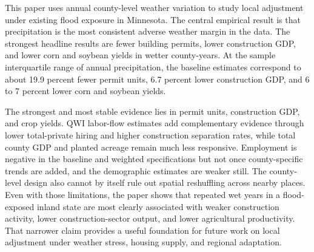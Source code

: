 \documentclass[12pt]{article}
\begin{document}
This paper uses annual county-level weather variation to study local adjustment under existing flood exposure in Minnesota. The central empirical result is that precipitation is the most consistent adverse weather margin in the data. The strongest headline results are fewer building permits, lower construction GDP, and lower corn and soybean yields in wetter county-years. At the sample interquartile range of annual precipitation, the baseline estimates correspond to about 19.9 percent fewer permit units, 6.7 percent lower construction GDP, and 6 to 7 percent lower corn and soybean yields.

The strongest and most stable evidence lies in permit units, construction GDP, and crop yields. QWI labor-flow estimates add complementary evidence through lower total-private hiring and higher construction separation rates, while total county GDP and planted acreage remain much less responsive. Employment is negative in the baseline and weighted specifications but not once county-specific trends are added, and the demographic estimates are weaker still. The county-level design also cannot by itself rule out spatial reshuffling across nearby places. Even with those limitations, the paper shows that repeated wet years in a flood-exposed inland state are most clearly associated with weaker construction activity, lower construction-sector output, and lower agricultural productivity. That narrower claim provides a useful foundation for future work on local adjustment under weather stress, housing supply, and regional adaptation.
\end{document}
